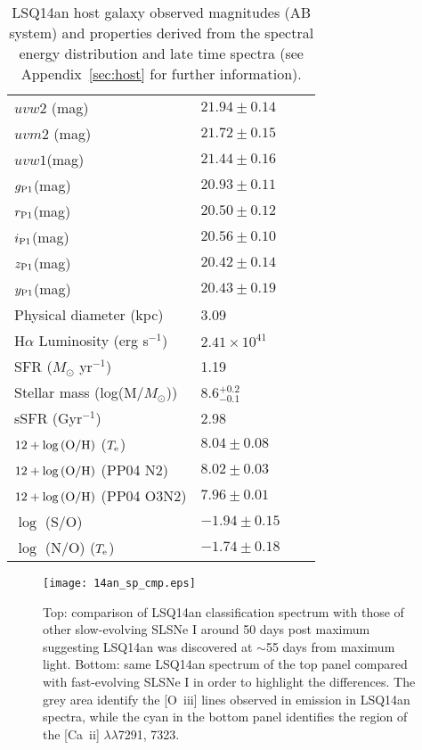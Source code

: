 \documentclass[useAMS,usenatbib]{mn2e}
\def\an{LSQ14an}
\def\oiii{[O~{\sc iii}]}
\begin{document}
\begin{table}
\centering
\caption{\an\/ host galaxy observed magnitudes (AB system) and properties derived from the spectral energy distribution and late time spectra (see Appendix~\ref{sec:host} for further information).}
\begin{tabular}[]{llll}
\hline
$uvw2$ (mag)& $ 21.94 \pm 0.14$\\
$uvm2$ (mag)& $  21.72 \pm 0.15$\\
$uvw1$(mag)& $  21.44 \pm 0.16$ \\
$g_{\rm P1}$(mag)& $  20.93\pm  0.11$\\
$r_{\rm P1}$(mag)& $ 20.50\pm   0.12$\\
$i_{\rm P1}$(mag)& $ 20.56\pm   0.10$\\
$z_{\rm P1}$(mag) & $ 20.42\pm   0.14$\\
$y_{\rm P1}$(mag)& $ 20.43 \pm 0.19$\\  
\hline
Physical diameter (kpc) & 3.09  \\ 
H$\alpha$ Luminosity (erg s$^{-1}$) &$2.41 \times 10^{41}$ \\
SFR ($M_{\odot}$ yr$^{-1}$) &1.19\\
Stellar mass (log(M/$M_{\odot}$)) &  8.6$^{+0.2}_{-0.1}$ \\
sSFR (Gyr$^{-1}$) & 2.98 \\
$12+\log {\rm(O/H)}$ ($T_{\rm e}$) & $8.04 \pm 0.08$ \\
$12+\log {\rm(O/H)}$ (PP04 N2) & $8.02 \pm 0.03$ \\
$12+\log {\rm(O/H)}$ (PP04 O3N2) & $7.96 \pm 0.01$\\
$\log$ (S/O) & $-1.94 \pm 0.15$ \\
$\log$ (N/O) ($T_{\rm e}$) & $-1.74 \pm 0.18$ \\ 
\hline 
\end{tabular}
\label{table:host}
\end{table}

\begin{figure}
\texttt{[image: 14an\_sp\_cmp.eps]}
\caption{Top: comparison of \an\/ classification spectrum with those of other slow-evolving SLSNe I \citep[SN 2007bi, PTF12dam, SN 2015bn;][]{gy09,yo10,ni13,ni16a} around 50 days post maximum suggesting \an\/ was discovered at $\sim$55 days from maximum light. Bottom: same \an\/ spectrum of the top panel compared with fast-evolving SLSNe I  \citep[SN~2011ke, SN~2012il and CSS121015;][]{in13,ben14} in order to highlight the differences. The grey area identify the \oiii\/ lines observed in emission in \an\/ spectra, while the cyan in the bottom panel identifies the region of the [Ca~{\sc ii}] $\lambda\lambda$7291, 7323.}
\label{fig:spcmp}
\end{figure}
\end{document}

